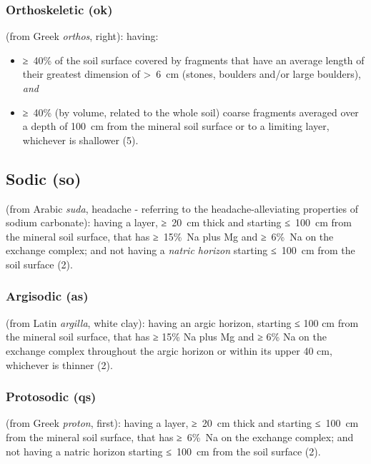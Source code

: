 \documentclass[
  letterpaper,
  DIV=11,
  numbers=noendperiod]{scrreprt}
\providecommand{\tightlist}{%
  \setlength{\itemsep}{0pt}\setlength{\parskip}{0pt}}\usepackage{longtable,booktabs,array}
\begin{document}
\hypertarget{orthoskeletic-ok}{%
\subsubsection{Orthoskeletic (ok)}\label{orthoskeletic-ok}}

(from Greek \emph{orthos}, right): having:

\begin{itemize}
\tightlist
\item
  ≥~40\% of the soil surface covered by fragments that have an average
  length of their greatest dimension of \textgreater~6~cm (stones,
  boulders and/or large boulders), \emph{and}
\item
  ≥~40\% (by volume, related to the whole soil) coarse fragments
  averaged over a depth of 100~cm from the mineral soil surface or to a
  limiting layer, whichever is shallower (5).
\end{itemize}

\hypertarget{sodic-so}{%
\subsection{Sodic (so)}\label{sodic-so}}

(from Arabic \emph{suda}, headache - referring to the
headache-alleviating properties of sodium carbonate): having a layer,
≥~20~cm thick and starting ≤~100~cm from the mineral soil surface, that
has ≥~15\%~Na plus Mg and ≥~6\%~Na on the exchange complex; and not
having a \emph{natric horizon} starting ≤~100~cm from the soil surface
(2).

\hypertarget{argisodic-as}{%
\subsubsection{Argisodic (as)}\label{argisodic-as}}

(from Latin \emph{argilla}, white clay): having an argic horizon,
starting ≤ 100 cm from the mineral soil surface, that has ≥ 15\% Na plus
Mg and ≥ 6\% Na on the exchange complex throughout the argic horizon or
within its upper 40 cm, whichever is thinner (2).

\hypertarget{protosodic-qs}{%
\subsubsection{Protosodic (qs)}\label{protosodic-qs}}

(from Greek \emph{proton}, first): having a layer, ≥~20~cm thick and
starting ≤~100~cm from the mineral soil surface, that has ≥~6\%~Na on
the exchange complex; and not having a natric horizon starting ≤~100~cm
from the soil surface (2).
\end{document}

